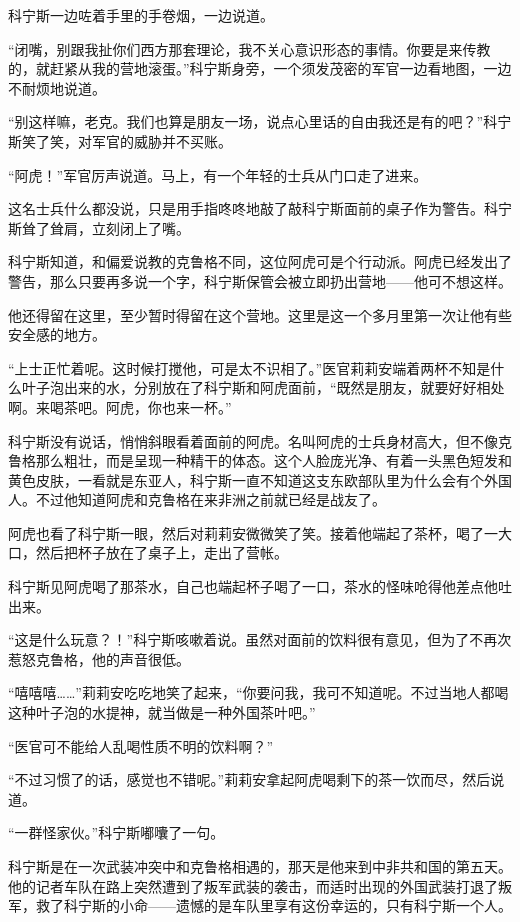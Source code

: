 科宁斯一边咗着手里的手卷烟，一边说道。

“闭嘴，别跟我扯你们西方那套理论，我不关心意识形态的事情。你要是来传教的，就赶紧从我的营地滚蛋。”科宁斯身旁，一个须发茂密的军官一边看地图，一边不耐烦地说道。

“别这样嘛，老克。我们也算是朋友一场，说点心里话的自由我还是有的吧？”科宁斯笑了笑，对军官的威胁并不买账。

“阿虎！”军官厉声说道。马上，有一个年轻的士兵从门口走了进来。

这名士兵什么都没说，只是用手指咚咚地敲了敲科宁斯面前的桌子作为警告。科宁斯耸了耸肩，立刻闭上了嘴。

科宁斯知道，和偏爱说教的克鲁格不同，这位阿虎可是个行动派。阿虎已经发出了警告，那么只要再多说一个字，科宁斯保管会被立即扔出营地——他可不想这样。

他还得留在这里，至少暂时得留在这个营地。这里是这一个多月里第一次让他有些安全感的地方。

“上士正忙着呢。这时候打搅他，可是太不识相了。”医官莉莉安端着两杯不知是什么叶子泡出来的水，分别放在了科宁斯和阿虎面前，“既然是朋友，就要好好相处啊。来喝茶吧。阿虎，你也来一杯。”

科宁斯没有说话，悄悄斜眼看着面前的阿虎。名叫阿虎的士兵身材高大，但不像克鲁格那么粗壮，而是呈现一种精干的体态。这个人脸庞光净、有着一头黑色短发和黄色皮肤，一看就是东亚人，科宁斯一直不知道这支东欧部队里为什么会有个外国人。不过他知道阿虎和克鲁格在来非洲之前就已经是战友了。

阿虎也看了科宁斯一眼，然后对莉莉安微微笑了笑。接着他端起了茶杯，喝了一大口，然后把杯子放在了桌子上，走出了营帐。

科宁斯见阿虎喝了那茶水，自己也端起杯子喝了一口，茶水的怪味呛得他差点他吐出来。

“这是什么玩意？！”科宁斯咳嗽着说。虽然对面前的饮料很有意见，但为了不再次惹怒克鲁格，他的声音很低。

“嘻嘻嘻……”莉莉安吃吃地笑了起来，“你要问我，我可不知道呢。不过当地人都喝这种叶子泡的水提神，就当做是一种外国茶叶吧。”

“医官可不能给人乱喝性质不明的饮料啊？”

“不过习惯了的话，感觉也不错呢。”莉莉安拿起阿虎喝剩下的茶一饮而尽，然后说道。

“一群怪家伙。”科宁斯嘟囔了一句。

科宁斯是在一次武装冲突中和克鲁格相遇的，那天是他来到中非共和国的第五天。他的记者车队在路上突然遭到了叛军武装的袭击，而适时出现的外国武装打退了叛军，救了科宁斯的小命——遗憾的是车队里享有这份幸运的，只有科宁斯一个人。

